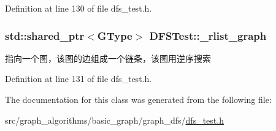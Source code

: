 Definition at line 130 of file dfs\+\_\+test.\+h.

\hypertarget{class_d_f_s_test_a93a79d0654eb82517990c8f5419148a8}{}
\subsubsection[{\+\_\+rlist\+\_\+graph}]{\setlength{\rightskip}{0pt plus 5cm}std\+::shared\+\_\+ptr$<${\bf G\+Type}$>$ D\+F\+S\+Test\+::\+\_\+rlist\+\_\+graph\hspace{0.3cm}{\ttfamily [protected]}}\label{class_d_f_s_test_a93a79d0654eb82517990c8f5419148a8}
指向一个图，该图的边组成一个链条，该图用逆序搜索 

Definition at line 131 of file dfs\+\_\+test.\+h.



The documentation for this class was generated from the following file\+:\begin{DoxyCompactItemize}
\item 
src/graph\+\_\+algorithms/basic\+\_\+graph/graph\+\_\+dfs/\hyperlink{dfs__test_8h}{dfs\+\_\+test.\+h}\end{DoxyCompactItemize}

